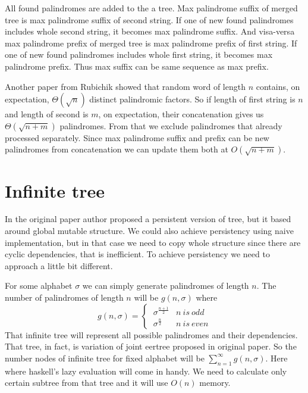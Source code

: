 All found palindromes are added to the a tree. Max palindrome suffix of merged tree is max palindrome suffix of second string. If one of new found palindromes includes whole second string, it becomes max palindrome suffix. And visa-versa max palindrome prefix of merged tree is max palindrome prefix of first string. If one of new found palindromes includes whole first string, it becomes max palindrome prefix. Thus max suffix can be same sequence as max prefix. 

Another paper from Rubichik \cite{rubinchik2016number} showed that random word of length $n$ contains, on expectation, $\Theta(\sqrt{n})$ distinct palindromic factors. So if length of first string is $n$ and length of second is $m$, on expectation, their concatenation gives us $\Theta(\sqrt{n + m})$ palindromes. From that we exclude palindromes that already processed separately. Since max palindrome suffix and prefix can be new palindromes from concatenation we can update them both at $O(\sqrt{n + m})$.   
\section{Infinite tree}
In the original paper author proposed a persistent version of tree, but it based around global mutable structure. We could also achieve persistency using naive implementation, but in that case we need to copy whole structure since there are cyclic dependencies, that is inefficient. To achieve persistency we need to approach a little bit different. 

For some alphabet $\sigma$ we can simply generate palindromes of length $n$. The number of palindromes of length $n$ will be $g(n, \sigma)$ where 
$$g(n, \sigma) = \begin{cases}
\ \sigma^{\frac{n+1}{2}}  & n \ is \ odd\\
\ \sigma^{\frac{n}{2}}   & n \ is \ even
\end{cases}$$
 That infinite tree will represent all possible palindromes and their dependencies. That tree, in fact, is variation of joint eertree proposed in original paper. So the number nodes of infinite tree for fixed alphabet will be $\sum_{n=1}^{\infty} g(n, \sigma)$. Here where haskell's lazy evaluation will come in handy. We need to calculate only certain subtree from that tree and it will use $O(n)$ memory. 
 
